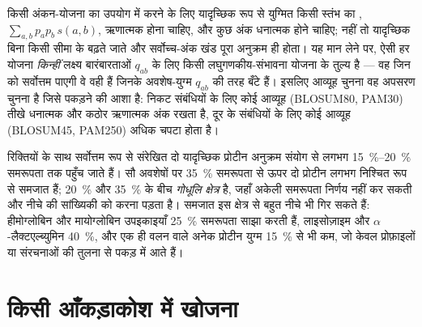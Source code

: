 \begin{proposition}[लघुगणकीय-संभावना क्यों]\label{prop:b3:bioinformatics:logodds}
किसी अंकन-योजना का उपयोग  में करने के लिए यादृच्छिक रूप
से युग्मित किसी स्तंभ का , $\sum_{a,b} p_{a} p_{b}\, s(a,b)$,
ऋणात्मक होना चाहिए, और कुछ अंक धनात्मक होने चाहिए; नहीं तो
यादृच्छिक  बिना किसी सीमा के बढ़ते जाते और सर्वोच्च-अंक खंड पूरा
अनुक्रम ही होता। यह मान लेने पर, ऐसी हर योजना \emph{किन्हीं} लक्ष्य
बारंबारताओं $q_{ab}$ के लिए किसी लघुगणकीय-संभावना योजना के तुल्य है ---
वह जिन  को सर्वोत्तम पाएगी वे वही हैं जिनके अवशेष-युग्म
$q_{ab}$ की तरह बँटे हैं। इसलिए आव्यूह चुनना वह अपसरण चुनना है जिसे
पकड़ने की आशा है: निकट संबंधियों के लिए कोई आव्यूह (BLOSUM80, PAM30)
तीखे धनात्मक और कठोर ऋणात्मक अंक रखता है, दूर के संबंधियों के लिए कोई
आव्यूह (BLOSUM45, PAM250) अधिक चपटा होता है।
\end{proposition}
\admitted

\begin{example}[समरूपता, सादृश्य और गोधूलि क्षेत्र]\label{ex:b3:bioinformatics:twilight}
रिक्तियों के साथ सर्वोत्तम रूप से संरेखित दो यादृच्छिक प्रोटीन अनुक्रम
संयोग से लगभग \qtyrange{15}{20}{\%} समरूपता तक पहुँच जाते हैं। सौ
अवशेषों पर \qty{35}{\%} समरूपता से ऊपर दो प्रोटीन लगभग निश्चित रूप से
समजात हैं; \qty{20}{\%} और \qty{35}{\%} के बीच \emph{गोधूलि क्षेत्र}
है, जहाँ अकेली समरूपता निर्णय नहीं कर सकती और नीचे की सांख्यिकी को करना
पड़ता है। समजात इस क्षेत्र से बहुत नीचे भी गिर सकते हैं: हीमोग्लोबिन और
मायोग्लोबिन उपइकाइयाँ \qty{25}{\%} समरूपता साझा करती हैं, लाइसोज़ाइम और
$\alpha$-लैक्टएल्ब्युमिन \qty{40}{\%}, और एक ही वलन वाले अनेक प्रोटीन
युग्म \qty{15}{\%} से भी कम, जो केवल प्रोफ़ाइलों या संरचनाओं की तुलना
से पकड़ में आते हैं।
\end{example}

\section{किसी आँकड़ाकोश में खोजना}

